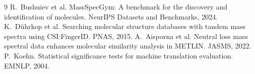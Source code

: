 \documentclass[11pt]{article}
\begin{document}
\begin{thebibliography}{9}\small
{} R.~Bushuiev et al. MassSpecGym: A benchmark for the discovery and identification of molecules.
  NeurIPS Datasets and Benchmarks, 2024.
 K.~D\"uhrkop et al. Searching molecular structure databases with tandem mass spectra using
  CSI:FingerID. PNAS, 2015.
 A.~Aisporna et al. Neutral loss mass spectral data enhances molecular similarity analysis in
  METLIN. JASMS, 2022.
 P.~Koehn. Statistical significance tests for machine translation evaluation. EMNLP, 2004.
\end{thebibliography}
\end{document}
